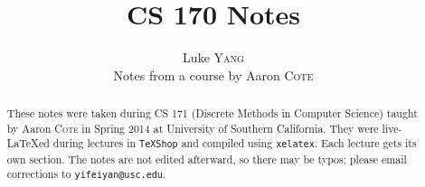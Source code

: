 \title{\large CS 170 Notes}
\setcounter{tocdepth}{1}
\author{Luke \textsc{Yang} \\ Notes from a course by Aaron \textsc{Cote}}

\begin{abstract}
These notes were taken during CS 171 (Discrete Methods in Computer Science) taught
by Aaron \textsc{Cote} in
Spring 2014 at University of Southern California.
They were
live-\LaTeX\-ed during lectures in \texttt{TeXShop} and compiled using
\texttt{xelatex}. Each lecture gets its own section. The notes are not edited
afterward, so there may be typos; please email corrections to
\texttt{yifeiyan@usc.edu}.
\end{abstract}

\maketitle
